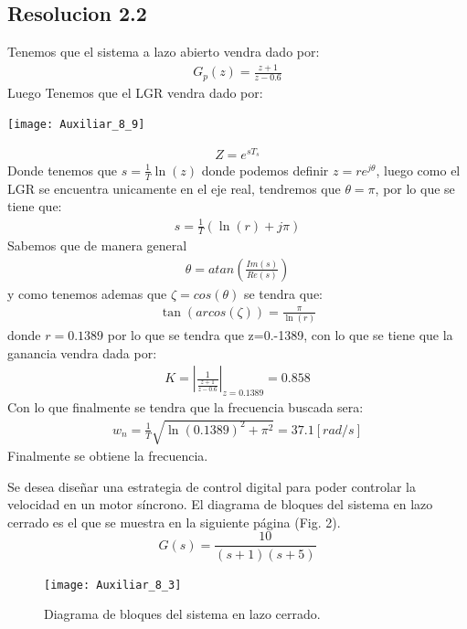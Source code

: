 \documentclass[
  11pt,
  letterpaper,
   addpoints,
  ]{exam}
\begin{document}
\begin{questions}
\begin{solution}
\subsection*{Resolucion 2.2}
Tenemos que el sistema a lazo abierto vendra dado por:
\begin{align}
    G_{p}(z) = \frac{z+1}{z-0.6}
\end{align}
Luego Tenemos que el LGR vendra dado por:
\begin{center}
    \texttt{[image: Auxiliar\_8\_9]}
\end{center}
\begin{align}
    Z= e^{sT_{s}}
\end{align}
Donde tenemos que $s=\frac{1}{T}\ln(z)$ donde podemos definir $z=re^{j\theta}$, luego como el LGR se encuentra unicamente en el eje real, tendremos que $\theta = \pi$, por lo que se tiene que:
\begin{align}
    s = \frac{1}{T}( \ln(r) + j \pi) 
\end{align}
Sabemos que de manera general 
\begin{align}
    \theta = atan\left(\frac{Im(s)}{Re(s)}\right)
\end{align}
y como tenemos ademas que $\zeta = cos(\theta)$ se tendra que:
\begin{align}
    \tan(arcos(\zeta)) = \frac{\pi}{\ln(r)}
\end{align}
donde $r=0.1389$ por lo que se tendra que z=0.-1389, con lo que se tiene que la ganancia vendra dada por:
\begin{align}
    K = \left| \frac{1}{\frac{z+1}{z-0.6}}\right|_{z=0.1389} = 0.858
\end{align}
Con lo que finalmente se tendra que la frecuencia buscada sera:
\begin{align}
    w_{n} = \frac{1}{T} \sqrt{\ln(0.1389)^{2}+\pi^{2}}= 37.1 [rad/s]
\end{align}
Finalmente se obtiene la frecuencia.
\end{solution}
\question Se desea diseñar una estrategia de control digital para poder controlar la velocidad en un motor síncrono. El diagrama de bloques del sistema en lazo cerrado es el que se muestra en la siguiente página (Fig. 2).
\[
G(s) = \frac{10}{(s + 1)(s + 5)}
\]
\begin{figure}[h!]
    \centering
    \texttt{[image: Auxiliar\_8\_3]}
    \caption{Diagrama de bloques del sistema en lazo cerrado.}
\end{figure}

\end{questions}
\end{document}

